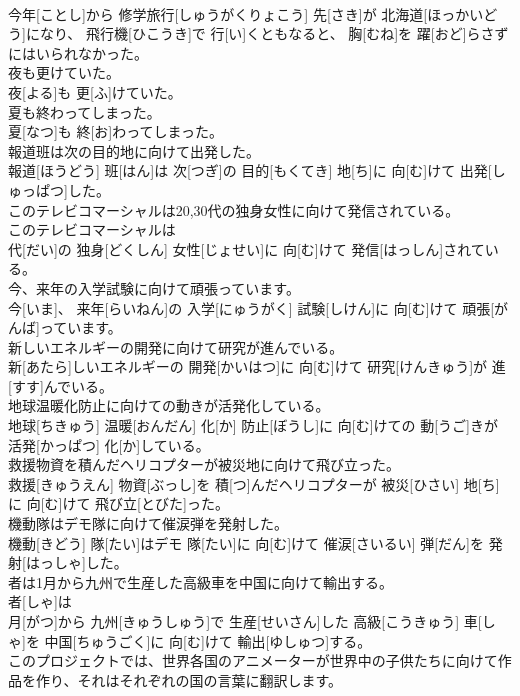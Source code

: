 \documentclass[8pt]{extreport}
\begin{document}
\begin{CJK}{UTF8}{min}
\\	今年[ことし]から 修学旅行[しゅうがくりょこう] 先[さき]が 北海道[ほっかいどう]になり、 飛行機[ひこうき]で 行[い]くともなると、 胸[むね]を 躍[おど]らさずにはいられなかった。
\\	夜も更けていた。	
\\	夜[よる]も 更[ふ]けていた。
\\	夏も終わってしまった。	
\\	夏[なつ]も 終[お]わってしまった。
\\	報道班は次の目的地に向けて出発した。	
\\	報道[ほうどう] 班[はん]は 次[つぎ]の 目的[もくてき] 地[ち]に 向[む]けて 出発[しゅっぱつ]した。
\\	このテレビコマーシャルは20,30代の独身女性に向けて発信されている。	
\\	このテレビコマーシャルは 
\\	代[だい]の 独身[どくしん] 女性[じょせい]に 向[む]けて 発信[はっしん]されている。
\\	今、来年の入学試験に向けて頑張っています。	
\\	今[いま]、 来年[らいねん]の 入学[にゅうがく] 試験[しけん]に 向[む]けて 頑張[がんば]っています。
\\	新しいエネルギーの開発に向けて研究が進んでいる。	
\\	新[あたら]しいエネルギーの 開発[かいはつ]に 向[む]けて 研究[けんきゅう]が 進[すす]んでいる。
\\	地球温暖化防止に向けての動きが活発化している。	
\\	地球[ちきゅう] 温暖[おんだん] 化[か] 防止[ぼうし]に 向[む]けての 動[うご]きが 活発[かっぱつ] 化[か]している。
\\	救援物資を積んだヘリコプターが被災地に向けて飛び立った。	
\\	救援[きゅうえん] 物資[ぶっし]を 積[つ]んだヘリコプターが 被災[ひさい] 地[ち]に 向[む]けて 飛び立[とびた]った。
\\	機動隊はデモ隊に向けて催涙弾を発射した。	
\\	機動[きどう] 隊[たい]はデモ 隊[たい]に 向[む]けて 催涙[さいるい] 弾[だん]を 発射[はっしゃ]した。
\\	者は1月から九州で生産した高級車を中国に向けて輸出する。	
\\	者[しゃ]は 
\\	月[がつ]から 九州[きゅうしゅう]で 生産[せいさん]した 高級[こうきゅう] 車[しゃ]を 中国[ちゅうごく]に 向[む]けて 輸出[ゆしゅつ]する。
\\	このプロジェクトでは、世界各国のアニメーターが世界中の子供たちに向けて作品を作り、それはそれぞれの国の言葉に翻訳します。	

\end{CJK}
\end{document}

